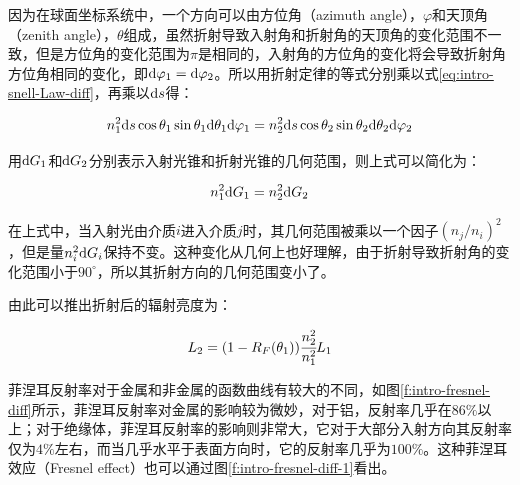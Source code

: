 \noindent 因为在球面坐标系统中，一个方向可以由方位角（azimuth angle），$\varphi$和天顶角（zenith angle），$\theta$组成，虽然折射导致入射角和折射角的天顶角的变化范围不一致，但是方位角的变化范围为$\pi$是相同的，入射角的方位角的变化将会导致折射角方位角相同的变化，即${\rm d}\varphi_1={\rm d}\varphi_2$。所以用折射定律的等式分别乘以式\ref{eq:intro-snell-Law-diff}，再乘以${\rm d}s$得：

\begin{equation}
	n^{2}_1{\rm d}s\cos\theta_1 \sin\theta_1 {\rm d}\theta_1 {\rm d}\varphi_1=n^{2}_2 {\rm d}s \cos\theta_2 \sin\theta_2 {\rm d}\theta_2 {\rm d}\varphi_2
\end{equation}

\noindent 用${\rm d}G_1$和${\rm d}G_2$分别表示入射光锥和折射光锥的几何范围，则上式可以简化为：

\begin{equation}\label{eq:eq-intro-eq:intro-snell-Law-1}
	n^{2}_1 {\rm d}G_1=n^{2}_2 {\rm d}G_2
\end{equation}

在上式中，当入射光由介质$i$进入介质$j$时，其几何范围被乘以一个因子$(n_j/n_i)^2$，但是量$n^2_i{\rm d}G_i$保持不变。这种变化从几何上也好理解，由于折射导致折射角的变化范围小于$90^{\circ}$，所以其折射方向的几何范围变小了。

由此可以推出折射后的辐射亮度为：

\begin{equation}\label{eq:intro-fresnel-refractiom}
	L_2=(1-R_F(\theta_1)) \cfrac{n^2_2}{n^2_1}L_1
\end{equation}

\noindent 菲涅耳反射率对于金属和非金属的函数曲线有较大的不同，如图\ref{f:intro-fresnel-diff}所示，菲涅耳反射率对金属的影响较为微妙，对于铝，反射率几乎在$86\%$以上；对于绝缘体，菲涅耳反射率的影响则非常大，它对于大部分入射方向其反射率仅为$4\%$左右，而当几乎水平于表面方向时，它的反射率几乎为$100\%$。这种菲涅耳效应（Fresnel effect）也可以通过图\ref{f:intro-fresnel-diff-1}看出。

